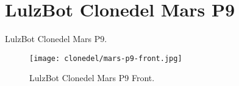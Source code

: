 %
%
%
%
%

\section{LulzBot Clonedel Mars P9}
LulzBot Clonedel Mars P9.

\begin{figure}[h!]
\texttt{[image: clonedel/mars-p9-front.jpg]}
 \caption{LulzBot Clonedel Mars P9 Front.}
 \label{fig:clonedel-mars-p9-front}
\end{figure}


